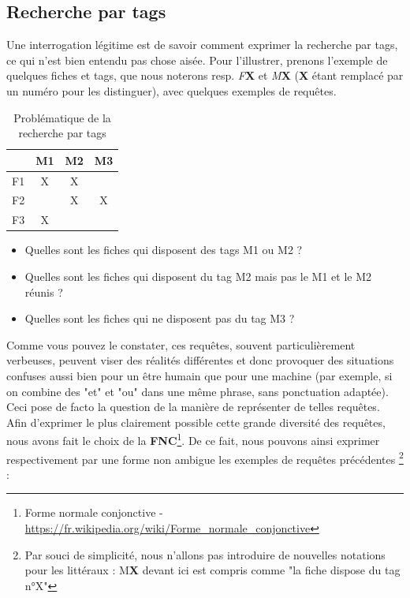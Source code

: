 \subsection*{Recherche par \glspl{tag}}

Une interrogation légitime est de savoir comment exprimer la recherche par \glspl{tag}, ce qui n'est bien entendu pas chose aisée.
Pour l'illustrer, prenons l'exemple de quelques \glspl{fiche} et \glspl{tag}, que nous noterons resp. \textit{F}\textbf{X} et \textit{M}\textbf{X}
(\textbf{X} étant remplacé par un numéro pour les distinguer), avec quelques exemples de requêtes.

\begin{table}[H]
    \centering
    \begin{tabular}{|c|c|c|c|}
        \hline
            & M1 & M2 & M3 \\ \hline
            F1 & X  & X  &    \\ \hline
            F2 &    & X  & X  \\ \hline
            F3 & X  &    &    \\ \hline
    \end{tabular}
    \caption{Problématique de la recherche par \glspl{tag}}
    \label{tab:fichesWithTagExample}
\end{table}

\begin{itemize}
    \item Quelles sont les \glspl{fiche} qui disposent des \glspl{tag} M1 ou M2 ?
    \item Quelles sont les \glspl{fiche} qui disposent du \gls{tag} M2 mais pas le M1 et le M2 réunis ?
    \item Quelles sont les \glspl{fiche} qui ne disposent pas du \gls{tag} M3 ?
\end{itemize}

Comme vous pouvez le constater, ces requêtes, souvent particulièrement verbeuses, peuvent viser des réalités différentes et donc provoquer des situations confuses aussi bien pour un être humain que pour une machine (par exemple, si on combine des "et" et "ou" dans une même phrase, sans ponctuation adaptée). 
Ceci pose de facto la question de la manière de représenter de telles requêtes.\\

Afin d'exprimer le plus clairement possible cette grande diversité des requêtes, nous avons fait le choix de la 
\textbf{FNC}\footnote{
    Forme normale conjonctive - 
    \url{https://fr.wikipedia.org/wiki/Forme\_normale\_conjonctive}
}. De ce fait, nous pouvons ainsi exprimer respectivement par une forme non ambigue les exemples de requêtes précédentes \footnote{
    Par souci de simplicité, nous n'allons pas introduire de nouvelles notations pour les littéraux : M\textbf{X} devant ici est compris comme "la fiche dispose du \gls{tag} n°X"
} :

